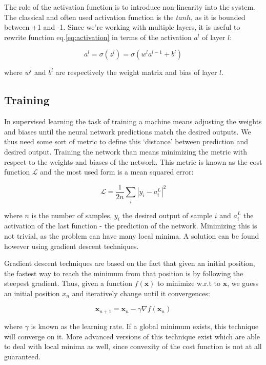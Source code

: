 \documentclass[12pt,a4paper,]{Dissertate}
\begin{document}
The role of the activation function is to introduce non-linearity into
the system. The classical and often used activation function is the
\(tanh\), as it is bounded between +1 and -1. Since we're working with
multiple layers, it is useful to rewrite function
eq.\ref{eq:activation} in terms of the activation \(a^l\) of layer
\(l\):

\[
a^l = \sigma(z^l) = \sigma(w^la^{l-1}+b^l)
\]

where \(w^l\) and \(b^l\) are respectively the weight matrix and bias of
layer \(l\).

\hypertarget{training}{%
\subsection{Training}\label{training}}

In supervised learning the task of training a machine means adjusting
the weights and biases until the neural network predictions match the
desired outputs. We thus need some sort of metric to define this
`distance' between prediction and desired output. Training the network
than means minimizing the metric with respect to the weights and biases
of the network. This metric is known as the cost function
\(\mathcal{L}\) and the most used form is a mean squared error:

\begin{equation}
\mathcal{L} = \frac{1}{2n}\sum_i|y_i-a^L_i|^2
\label{eq:MSE}\end{equation}

where \(n\) is the number of samples, \(y_i\) the desired output of
sample \(i\) and \(a^L_i\) the activation of the last function - the
prediction of the network. Minimizing this is not trivial, as the
problem can have many local minima. A solution can be found however
using gradient descent techniques.

Gradient descent techniques are based on the fact that given an initial
position, the fastest way to reach the minimum from that position is by
following the steepest gradient. Thus, given a function
\(f(\mathbf{x})\) to minimize w.r.t to \(\mathbf{x}\), we guess an
initial position \(x_n\) and iteratively change until it convergences:

\[
\mathbf{x}_{n+1} = \mathbf{x}_{n}-\gamma\nabla f(\mathbf{x}_n)
\]

where \(\gamma\) is known as the learning rate. If a global minimum
exists, this technique will converge on it. More advanced versions of
this technique exist which are able to deal with local minima as well,
since convexity of the cost function is not at all guaranteed.
\end{document}
